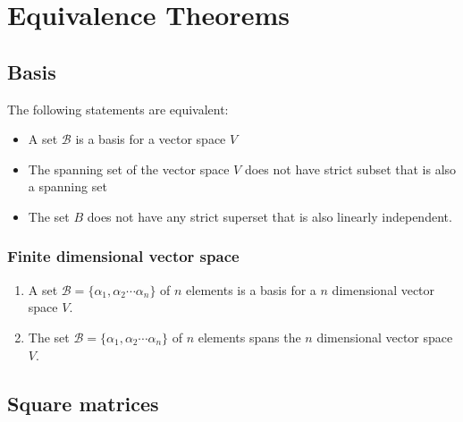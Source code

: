 \documentclass[main.tex]{subfiles}
\begin{document}
\chapter{Equivalence Theorems}
\section{Basis}
The following statements are equivalent:
\begin{itemize}
    \item A set $\mathcal{B}$ is a basis for a vector space $V$
    \item The spanning set of the vector space $V$     does not have strict subset that is also a spanning set
    \item The set $B$ does not have any strict superset that is also linearly independent. 
\end{itemize}
\subsection{Finite dimensional vector space}
\begin{enumerate}
    \item A set $\mathcal{B} = \{\alpha_1, \alpha_2 \cdots \alpha_n \}$ of $n$ elements is a basis for a $n$ dimensional vector space $V$. 
    \item \label{span} The set $\mathcal{B} = \{\alpha_1, \alpha_2 \cdots \alpha_n \}$ of $n$ elements spans the $n$ dimensional vector space $V$. 
\end{enumerate}


\section{Square matrices}
\end{document}
